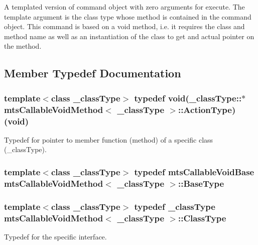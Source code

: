 A templated version of command object with zero arguments for execute. The template argument is the class type whose method is contained in the command object. This command is based on a void method, i.\+e. it requires the class and method name as well as an instantiation of the class to get and actual pointer on the method. 

\subsection{Member Typedef Documentation}
\hypertarget{classmts_callable_void_method_af30fcc122aaea0b5870f22f57cf5e5ba}{}
\subsubsection[{Action\+Type}]{\setlength{\rightskip}{0pt plus 5cm}template$<$class \+\_\+class\+Type$>$ typedef void(\+\_\+class\+Type\+::$\ast$ {\bf mts\+Callable\+Void\+Method}$<$ \+\_\+class\+Type $>$\+::Action\+Type) (void)}\label{classmts_callable_void_method_af30fcc122aaea0b5870f22f57cf5e5ba}
Typedef for pointer to member function (method) of a specific class (\+\_\+class\+Type). \hypertarget{classmts_callable_void_method_a5afd27bcc6880473f6e89e712a189afc}{}
\subsubsection[{Base\+Type}]{\setlength{\rightskip}{0pt plus 5cm}template$<$class \+\_\+class\+Type$>$ typedef {\bf mts\+Callable\+Void\+Base} {\bf mts\+Callable\+Void\+Method}$<$ \+\_\+class\+Type $>$\+::{\bf Base\+Type}}\label{classmts_callable_void_method_a5afd27bcc6880473f6e89e712a189afc}
\hypertarget{classmts_callable_void_method_a912290d7a57cc13fd33481e16d471467}{}
\subsubsection[{Class\+Type}]{\setlength{\rightskip}{0pt plus 5cm}template$<$class \+\_\+class\+Type$>$ typedef \+\_\+class\+Type {\bf mts\+Callable\+Void\+Method}$<$ \+\_\+class\+Type $>$\+::{\bf Class\+Type}}\label{classmts_callable_void_method_a912290d7a57cc13fd33481e16d471467}
Typedef for the specific interface. \hypertarget{classmts_callable_void_method_ae73e9f4d10f5be65841fac6109f48e0b}{}
